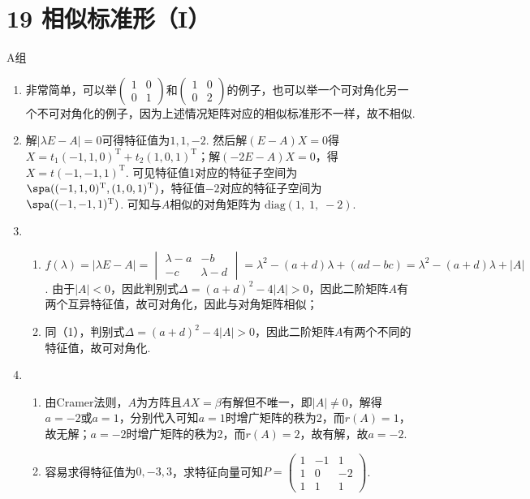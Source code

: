 \section*{19 相似标准形（I）}

\vspace{2ex}

\centerline{\heiti A组}
\begin{enumerate}
    \item 非常简单，可以举$\begin{pmatrix}
        1 & 0 \\ 0 & 1
    \end{pmatrix}$和$\begin{pmatrix}
        1 & 0 \\ 0 & 2
    \end{pmatrix}$的例子，也可以举一个可对角化另一个不可对角化的例子，因为上述情况矩阵对应的相似标准形不一样，故不相似.

    \item 解$|\lambda E-A|=0$可得特征值为$1,1,-2$. 然后解$(E-A)X=0$得$X=t_1(-1,1,0)^\mathrm{T}+t_2(1,0,1)^\mathrm{T}$；解$(-2E-A)X=0$，得$X=t(-1,-1,1)^\mathrm{T}$. 可见特征值1对应的特征子空间为$\spa((-1,1,0)^\mathrm{T},(1,0,1)^\mathrm{T})$，特征值$-2$对应的特征子空间为 $\spa((-1,-1,1)^\mathrm{T})$. 可知与$A$相似的对角矩阵为 $\mathrm{diag}(1,\;1,\;-2)$.

    \item \begin{enumerate}
        \item $f(\lambda)=|\lambda E-A|=\begin{vmatrix}
            \lambda-a & -b \\ -c & \lambda-d
        \end{vmatrix}=\lambda^2-(a+d)\lambda+(ad-bc)=\lambda^2-(a+d)\lambda+|A|$. 由于$|A|<0$，因此判别式$\Delta=(a+d)^2-4|A|>0$，因此二阶矩阵$A$有两个互异特征值，故可对角化，因此与对角矩阵相似；
        \item 同（1），判别式$\Delta=(a+d)^2-4|A|>0$，因此二阶矩阵$A$有两个不同的特征值，故可对角化.
    \end{enumerate}

    \item \begin{enumerate}
        \item 由Cramer法则，$A$为方阵且$AX=\beta$有解但不唯一，即$|A|\neq 0$，解得$a=-2$或$a=1$，分别代入可知$a=1$时增广矩阵的秩为2，而$r(A)=1$，故无解；$a=-2$时增广矩阵的秩为2，而$r(A)=2$，故有解，故$a=-2$.
        \item 容易求得特征值为$0,-3,3$，求特征向量可知$P=\begin{pmatrix}
            1 & -1 & 1 \\ 1 & 0 & -2 \\ 1 & 1 & 1
        \end{pmatrix}$.
    \end{enumerate}


\end{enumerate}
